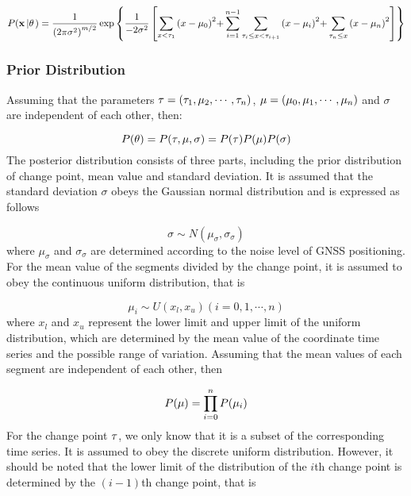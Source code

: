 \documentclass{svjour3}                     %
\begin{document}
\begin{equation}\label{eq_likelihoodfunc_detail}
P({\bf{x}}\left| {\bf{\theta }} \right.) = \frac{1}{{{{(2\pi {\sigma ^2})}^{m/2}}}}\exp \left\{ {\frac{1}{{ - 2{\sigma ^2}}}\left[ {\sum\limits_{x < {\tau _1}} {{{(x - {\mu_0})}^2}} {\rm{ + }}\sum\limits_{i = 1}^{n - 1} {\sum\limits_{{\tau _i} \le x < {\tau _{i + 1}}} {{{(x - {\mu_i})}^2}} } {\rm{ + }}\sum\limits_{{\tau _n} \le x} {{{(x - {\mu_n})}^2}} } \right]} \right\}
\end{equation}

\subsubsection{Prior Distribution}
Assuming that the parameters ${\bf{\tau }}=(\tau_1,\mu_2,\cdots,\tau_n)$, ${\bf{\mu }}=(\mu_0,\mu_1,\cdots,\mu_n)$ and $\sigma$ are independent of each other, then:

\begin{equation}\label{eq_bayesian_prior}
P({\bf{\theta }}) = P({\bf{\tau }},{\bf{\mu }},\sigma ) = P({\bf{\tau }})P({\bf{\mu }})P(\sigma )
\end{equation}
The posterior distribution consists of three parts, including the prior distribution of change point, mean value and standard deviation. It is assumed that the standard deviation $\sigma$ obeys the Gaussian normal distribution and is expressed as follows

\begin{equation}\label{eq_bayesian_prior_sigma}
\sigma  \sim N({\mu _\sigma },{\sigma _\sigma })
\end{equation}
where $\mu_{\sigma}$ and $\sigma_{\sigma}$ are determined according to the noise level of GNSS positioning.
For the mean value of the segments divided by the change point, it is assumed to obey the continuous uniform distribution, that is

\begin{equation}\label{eq_bayesian_prior_mu}
{\mu _i} \sim U({x_l },{x_u })(i = 0,1, \cdots ,n)
\end{equation}
where $x_l$ and $x_u$ represent the lower limit and  upper limit of the uniform distribution, which are determined by the mean value of the coordinate time series and the possible range of variation. Assuming that the mean values of each segment are independent of each other, then

\begin{equation}\label{eq_bayesian_prior_mu_sum}
P({\bf{\mu }}) = \prod\limits_{i = 0}^n {P({\mu _i})}
\end{equation}
For the change point ${\bf{\tau }}$, we only know that it is a subset of the corresponding time series.
It is assumed to obey the discrete uniform distribution. However, it should be noted that the lower limit of the distribution of the $i$th change point is determined by the $(i-1)$th change point, that is
\end{document}
